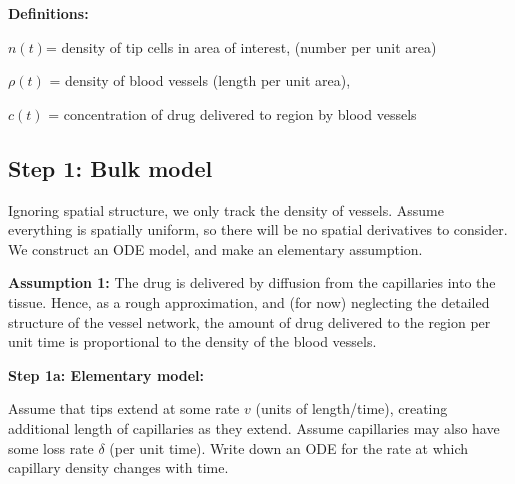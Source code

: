\textbf{Definitions:} 

$n(t)$= density of tip cells in area of interest, (number per unit area)

$\rho(t)$ = density of blood vessels (length per unit area),

$c(t)$ = concentration of drug delivered to region by blood vessels



\subsection{Step 1: Bulk model}

Ignoring spatial structure, we only track the density of vessels. Assume everything is spatially uniform, so there will be no spatial derivatives to consider. We construct an ODE model, and make an elementary assumption.

\textbf{Assumption 1:} The drug is delivered by diffusion from the capillaries into the tissue. Hence, as a rough approximation, and (for now) neglecting the detailed structure of the vessel network, the amount of drug delivered to the region per unit time is proportional to the density of the blood vessels.

\textbf{Step 1a: Elementary model:}

Assume that tips extend at some rate $v$ (units of length/time), creating additional length of capillaries as they extend. Assume capillaries may also have some loss rate $\delta$ (per unit time). Write down an ODE for the rate at which capillary density changes with time.


